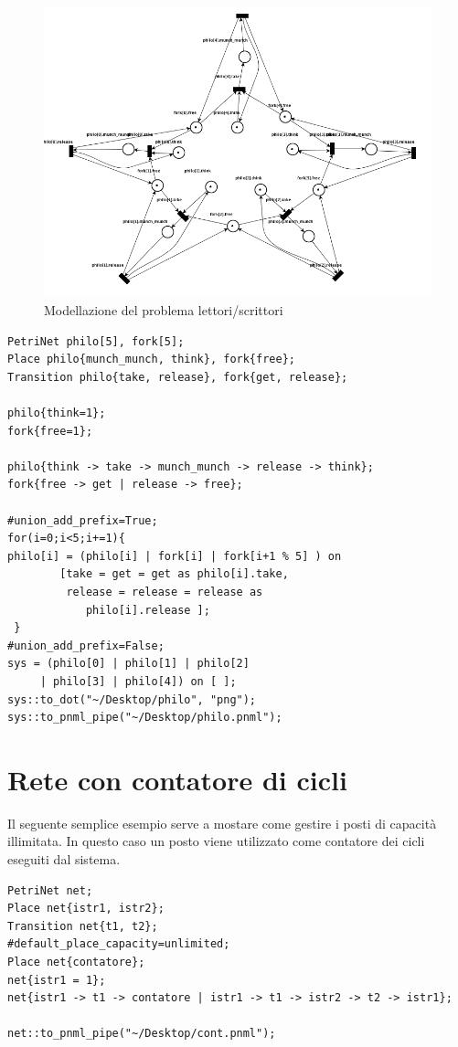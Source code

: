 \documentclass[italian,12pt]{book}
\begin{document}
\begin{figure}[htb]
\centerline{\includegraphics[width=12cm]{img/philosophers.png}}
\caption{Modellazione del problema lettori/scrittori}\label{fig:philosophers.png}
\end{figure}

\begin{verbatim}PetriNet philo[5], fork[5];
Place philo{munch_munch, think}, fork{free};
Transition philo{take, release}, fork{get, release};

philo{think=1};
fork{free=1};

philo{think -> take -> munch_munch -> release -> think};
fork{free -> get | release -> free};

#union_add_prefix=True;
for(i=0;i<5;i+=1){
philo[i] = (philo[i] | fork[i] | fork[i+1 % 5] ) on 
        [take = get = get as philo[i].take, 
         release = release = release as 
            philo[i].release ];
 }
#union_add_prefix=False;
sys = (philo[0] | philo[1] | philo[2] 
     | philo[3] | philo[4]) on [ ];
sys::to_dot("~/Desktop/philo", "png");
sys::to_pnml_pipe("~/Desktop/philo.pnml");
\end{verbatim}

\section{Rete con contatore di cicli}
Il seguente semplice esempio serve a mostare come gestire i posti di
capacità illimitata. In questo caso un posto viene utilizzato come
contatore dei cicli eseguiti dal sistema.

\begin{verbatim}PetriNet net;
Place net{istr1, istr2};
Transition net{t1, t2};
#default_place_capacity=unlimited;
Place net{contatore};
net{istr1 = 1};
net{istr1 -> t1 -> contatore | istr1 -> t1 -> istr2 -> t2 -> istr1};

net::to_pnml_pipe("~/Desktop/cont.pnml");

\end{verbatim}

%


\end{document}
